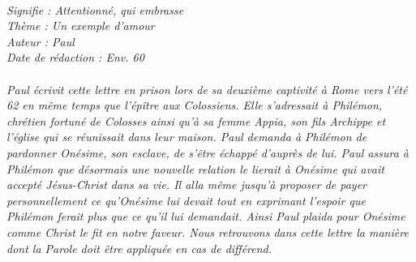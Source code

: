 \BFont
\noindent\hrulefill
{\footnotesize
\textit{
\bigskip
{\centering{}
\\Signifie : Attentionné, qui embrasse
\\Thème : Un exemple d'amour
\\Auteur : Paul
\\Date de rédaction : Env. 60\\}
}
\textit{
\\Paul écrivit cette lettre en prison lors de sa deuxième captivité à Rome vers l’été 62 en même temps que l’épître aux Colossiens. Elle s’adressait à Philémon, chrétien fortuné de Colosses ainsi qu’à sa femme Appia, son fils Archippe et l’église qui se réunissait dans leur maison. Paul demanda à Philémon de pardonner Onésime, son esclave, de s’être échappé d’auprès de lui. Paul assura à Philémon que désormais une nouvelle relation le lierait à Onésime qui avait accepté Jésus-Christ dans sa vie. Il alla même jusqu’à proposer de payer personnellement ce qu’Onésime lui devait tout en exprimant l’espoir que Philémon ferait plus que ce qu’il lui demandait. Ainsi Paul plaida pour Onésime comme Christ le fit en notre faveur. Nous retrouvons dans cette lettre la manière dont la Parole doit être appliquée en cas de différend.\bigskip
}
}
\par\nobreak\noindent\hrulefill
